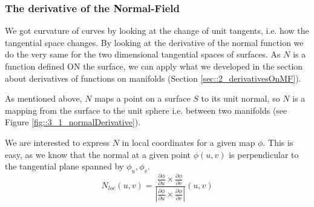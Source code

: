 %
%
%

\subsubsection{The derivative of the Normal-Field}
We got curvature of curves by looking at the change of unit tangents, i.e. how the tangential space changes. By looking at the derivative of the normal function we do the very same for the two dimensional tangential spaces of surfaces. As $N$ is a function defined ON the surface, we can apply what we developed in the section about derivatives of functions on manifolds (Section \ref{sec::2_derivativesOnMF}).

As mentioned above, $N$ maps a point on a surface $S$ to its unit normal, so $N$ is a mapping from the surface to the unit sphere i.e. between two manifolds (see Figure \ref{fig::3_1_normalDerivative}).

We are interested to express $N$ in local coordinates for a given map $\phi$. This is easy, as we know that the normal at a given point $\phi(u,v)$ is perpendicular to the tangential plane spanned by $\phi_u, \phi_v$.
\[N_{loc}(u,v) = \frac{\frac{\partial \phi}{\partial u} \times \frac{\partial \phi}{\partial v}}{|\frac{\partial \phi}{\partial u} \times \frac{\partial \phi}{\partial v}|} (u,v) \]

